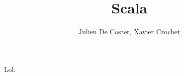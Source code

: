 \documentclass[10pt,a4paper]{report}
\author{Julien De Coster, Xavier Crochet}
\title{Scala}
\begin{document}
Lol.
\end{document}
